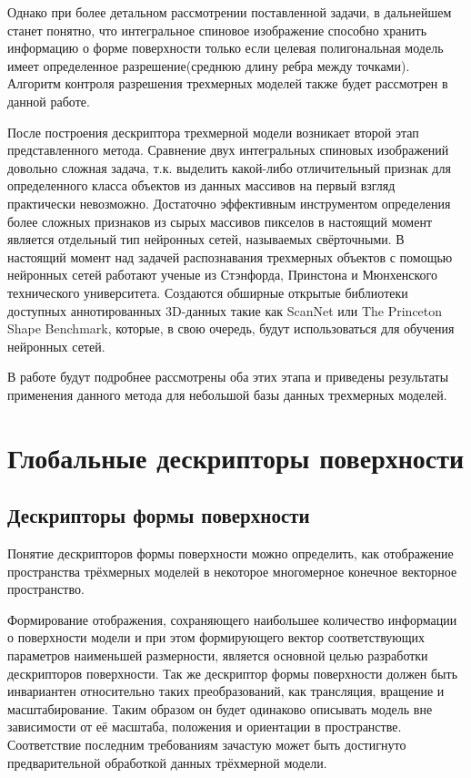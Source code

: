 \documentclass[14pt]{article}
\numberwithin{figure}{section}
\numberwithin{equation}{section}
\begin{document}
Однако при более детальном рассмотрении поставленной задачи, в дальнейшем станет понятно, что интегральное спиновое изображение способно хранить информацию о форме поверхности только если целевая полигональная модель имеет определенное разрешение(среднюю длину ребра между точками). Алгоритм контроля разрешения трехмерных моделей также будет рассмотрен в данной работе.

После построения дескриптора трехмерной модели возникает второй этап представленного метода. Сравнение двух интегральных спиновых изображений довольно сложная задача, т.к. выделить какой-либо отличительный признак для определенного класса объектов из данных массивов на первый взгляд практически невозможно. Достаточно эффективным инструментом определения более сложных признаков из сырых массивов пикселов в настоящий момент является отдельный тип нейронных сетей, называемых свёрточными.%
В настоящий момент над задачей распознавания трехмерных объектов с помощью нейронных сетей работают ученые из Стэнфорда, Принстона и Мюнхенского технического университета. Создаются обширные открытые библиотеки доступных аннотированных 3D-данных такие как ScanNet или The Princeton Shape Benchmark, которые, в свою очередь, будут использоваться для обучения нейронных сетей.%

В работе будут подробнее рассмотрены оба этих этапа и приведены результаты применения данного метода для небольшой базы данных трехмерных моделей.

\section{Глобальные дескрипторы поверхности}

\subsection{Дескрипторы формы поверхности}

Понятие дескрипторов формы поверхности можно определить, как отображение пространства трёхмерных моделей в некоторое многомерное конечное векторное пространство.

Формирование отображения, сохраняющего наибольшее количество информации о поверхности модели и при этом формирующего вектор соответствующих параметров наименьшей размерности, является основной целью разработки дескрипторов поверхности. Так же дескриптор формы поверхности должен быть инвариантен относительно таких преобразований, как трансляция, вращение и масштабирование. Таким образом он будет одинаково описывать модель вне зависимости от её масштаба, положения и ориентации в пространстве. Соответствие последним требованиям зачастую может быть достигнуто предварительной обработкой данных трёхмерной модели.
\end{document}
